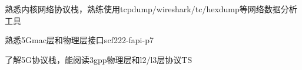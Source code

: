   \item 熟悉内核网络协议栈，熟练使用tcpdump/wireshark/tc/hexdump等网络数据分析工具
  \item 熟悉5Gmac层和物理层接口scf222-fapi-p7
  \item 了解5G协议栈，能阅读3gpp物理层和l2/l3层协议TS
